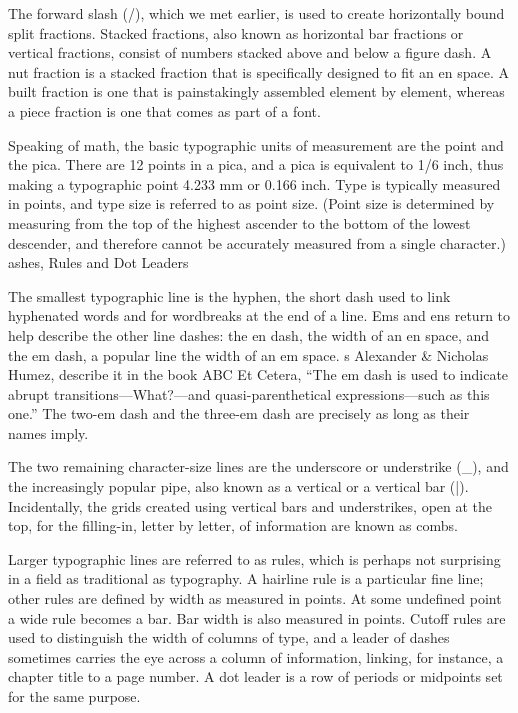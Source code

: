 \documentclass[12pt,a4paper,twocolumn]{book} %
\begin{document}
The forward slash (/), which we met earlier, is used to create horizontally bound split fractions. Stacked fractions, also known as horizontal bar fractions or vertical fractions, consist of numbers stacked above and below a figure dash. A nut fraction is a stacked fraction that is specifically designed to fit an en space. A built fraction is one that is painstakingly assembled element by element, whereas a piece fraction is one that comes as part of a font.

Speaking of math, the basic typographic units of measurement are the point and the pica. There are 12 points in a pica, and a pica is equivalent to 1/6 inch, thus making a typographic point 4.233 mm or 0.166 inch. Type is typically measured in points, and type size is referred to as point size. (Point size is determined by measuring from the top of the highest ascender to the bottom of the lowest descender, and therefore cannot be accurately measured from a single character.)
ashes, Rules and Dot Leaders

The smallest typographic line is the hyphen, the short dash used to link hyphenated words and for wordbreaks at the end of a line. Ems and ens return to help describe the other line dashes: the en dash, the width of an en space, and the em dash, a popular line the width of an em space.
s Alexander & Nicholas Humez, describe it in the book ABC Et Cetera, “The em dash is used to indicate abrupt transitions—What?—and quasi-parenthetical expressions—such as this one.” The two-em dash and the three-em dash are precisely as long as their names imply.

The two remaining character-size lines are the underscore or understrike (_), and the increasingly popular pipe, also known as a vertical or a vertical bar (|). Incidentally, the grids created using vertical bars and understrikes, open at the top, for the filling-in, letter by letter, of information are known as combs.

Larger typographic lines are referred to as rules, which is perhaps not surprising in a field as traditional as typography. A hairline rule is a particular fine line; other rules are defined by width as measured in points. At some undefined point a wide rule becomes a bar. Bar width is also measured in points. Cutoff rules are used to distinguish the width of columns of type, and a leader of dashes sometimes carries the eye across a column of information, linking, for instance, a chapter title to a page number. A dot leader is a row of periods or midpoints set for the same purpose.
\end{document}
